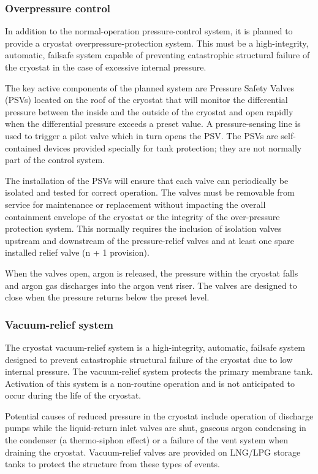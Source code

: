 \subsubsection{Overpressure control}

In addition to the normal-operation pressure-control system, it is planned to provide a cryostat overpressure-protection system. This must be a high-integrity, automatic, failsafe system capable of preventing catastrophic structural failure of the cryostat in the case of excessive internal pressure.

The key active components of the planned system are Pressure Safety Valves (PSVs) located on the roof of the cryostat that will monitor the differential pressure between the inside and the outside of the cryostat and open rapidly when the differential pressure exceeds a preset value. A pressure-sensing line is used to trigger a pilot valve which in turn opens the PSV. The PSVs are self-contained devices provided specially for tank protection; they are not normally part of the control system. 

The installation of the PSVs will ensure that each valve can periodically be isolated and tested for correct operation. The valves must be removable from service for maintenance or replacement without impacting the overall containment envelope of the cryostat or the integrity of the over-pressure protection system. This normally requires the inclusion of isolation valves upstream and downstream of the pressure-relief valves and at least one spare installed relief valve (n + 1 provision). 

When the valves open, argon is released, the pressure within the cryostat falls and argon gas discharges into the argon vent riser. The valves are designed to close when the pressure returns below the preset level.

\subsubsection{Vacuum-relief system}

The cryostat vacuum-relief system is a high-integrity, automatic, failsafe system designed to prevent catastrophic structural failure of the cryostat due to low internal pressure. The vacuum-relief system protects the primary membrane tank. Activation of this system is a non-routine operation and is not anticipated to occur during the life of the cryostat.

Potential causes of reduced pressure in the cryostat include operation of discharge pumps while the liquid-return inlet valves are shut, gaseous argon condensing in the condenser (a thermo-siphon effect) or a failure of the vent system when draining the cryostat. Vacuum-relief valves are provided on LNG/LPG storage tanks to protect the structure from these types of events.

